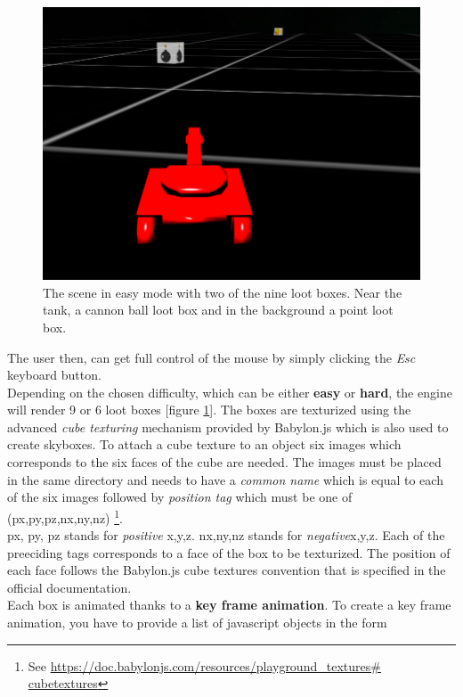 \documentclass[14pt]{article}
\begin{document}
\begin{figure}[H]
\center
\includegraphics[width = 12cm]{images/lootBoxes.png}
\caption{The scene in easy mode with two of the nine loot boxes. Near the tank, a cannon ball loot box and in the background a point loot box.}
\label{img:lootBoxes}
\end{figure}

The user then, can get full control of the mouse by simply clicking the \textit{Esc} keyboard button.\\
Depending on the chosen difficulty, which can be either \textbf{easy} or \textbf{hard}, the engine will render 9 or 6 loot boxes [figure \ref{img:lootBoxes}]. The boxes are texturized using the advanced \textit{cube texturing} mechanism provided by Babylon.js which is also used to create skyboxes. To attach a cube texture to an object six images which corresponds to the six faces of the cube are needed. The images must be placed in the same directory and needs to have a \textit{common name} which is equal to each of the six images followed by \textit{position tag} which must be one of (px,py,pz,nx,ny,nz) \footnote{See \url{https://doc.babylonjs.com/resources/playground_textures\# cubetextures}}. \\
px, py, pz stands for \textit{positive} x,y,z. nx,ny,nz stands for \textit{negative}x,y,z. Each of the preeciding tags corresponds to a face of the box to be texturized. The position of each face follows the Babylon.js cube textures convention that is specified in the official documentation.\\
Each box is animated thanks to a \textbf{key frame animation}.
To create a key frame animation, you have to provide a list of javascript objects in the form 
\end{document}

